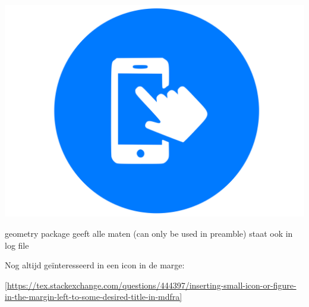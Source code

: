 \documentclass[../../main.tex]{subfiles}
\begin{document}
\begin{flushleft}
\begin{minipage}{.45\textwidth}
\includegraphics[width=\textwidth]{./img/smartphone verplicht.png}
\end{minipage}%
\hfill
\begin{minipage}{.5\textwidth}
\end{minipage}
\end{flushleft}



geometry package geeft alle maten (can only be used in preamble)
staat ook in log file

\the\marginparwidth



Nog altijd ge\"interesseerd in een icon in de marge:

\ref{https://tex.stackexchange.com/questions/444397/inserting-small-icon-or-figure-in-the-margin-left-to-some-desired-title-in-mdfra}
\end{document}
